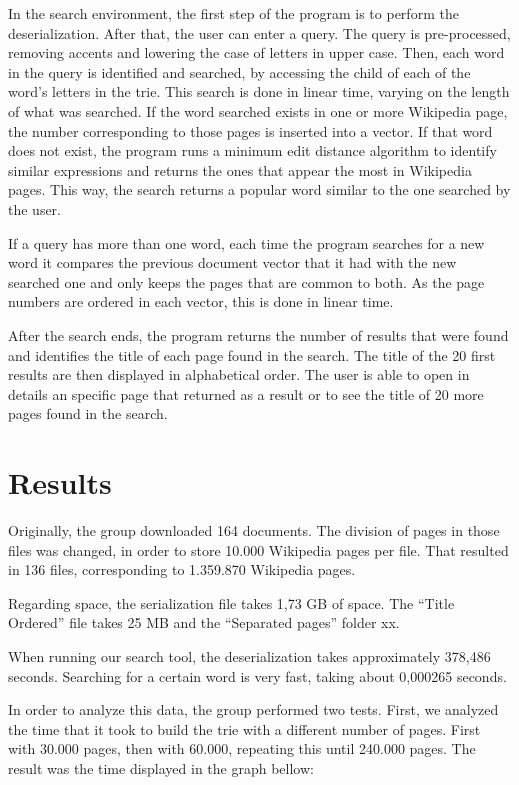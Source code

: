 \documentclass{article}
\begin{document}
In the search environment, the first step of the program is to perform the deserialization. After that, the user can enter a query.  The query is pre-processed, removing accents and lowering the case of letters in upper case. Then, each word in the query is identified and searched, by accessing the child of each of the word's letters in the trie. This search is done in linear time, varying on the length of what was searched. If the word searched exists in one or more Wikipedia page, the number corresponding to those pages is inserted into a vector. If that word does not exist, the program runs a minimum edit distance algorithm to identify similar expressions and returns the ones that appear the most in Wikipedia pages. This way, the search returns a popular word similar to the one searched by the user. 

If a query has more than one word, each time the program searches for a new word it compares the previous document vector that it had with the new searched one and only keeps the pages that are common to both. As the page numbers are ordered in each vector, this is done in linear time. 

After the search ends, the program returns the number of results that were found and identifies the title of each page found in the search. The title of the 20 first results are then displayed in alphabetical order. The user is able to open in details an specific page that returned as a result or to see the title of 20 more pages found in the search. 


\section*{Results}
Originally, the group downloaded 164 documents. The division of pages in those files was changed, in order to store 10.000 Wikipedia pages per file. That resulted in 136 files, corresponding to 1.359.870 Wikipedia pages. 

Regarding space, the serialization file takes 1,73 GB of space. The ``Title Ordered'' file takes 25 MB and the ``Separated pages'' folder xx. 

When running our search tool, the deserialization takes approximately 378,486 seconds. Searching for a certain word is very fast, taking about 0,000265 seconds. 

In order to analyze this data, the group performed two tests. First, we analyzed the time that it took to build the trie with a different number of pages. First with 30.000 pages, then with 60.000, repeating this until 240.000 pages. The result was the time displayed in the graph bellow:
\end{document}
